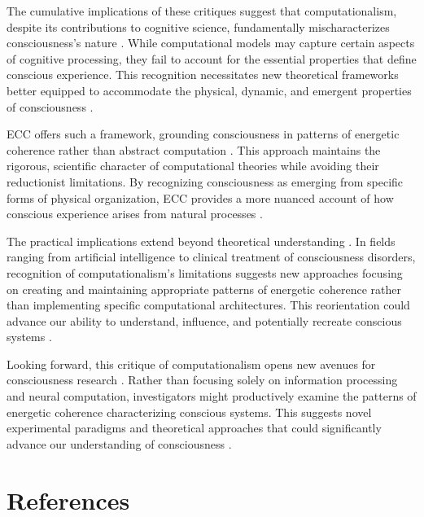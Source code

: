 \begin{refsection}
The cumulative implications of these critiques suggest that computationalism, despite its contributions to cognitive science, fundamentally mischaracterizes consciousness's nature \cite{dreyfus1972what}. While computational models may capture certain aspects of cognitive processing, they fail to account for the essential properties that define conscious experience. This recognition necessitates new theoretical frameworks better equipped to accommodate the physical, dynamic, and emergent properties of consciousness \cite{wheeler2005reconstructing}.

ECC offers such a framework, grounding consciousness in patterns of energetic coherence rather than abstract computation \cite{maturana1980autopoiesis}. This approach maintains the rigorous, scientific character of computational theories while avoiding their reductionist limitations. By recognizing consciousness as emerging from specific forms of physical organization, ECC provides a more nuanced account of how conscious experience arises from natural processes \cite{searle1980minds}.

The practical implications extend beyond theoretical understanding \cite{harnad1990symbol}. In fields ranging from artificial intelligence to clinical treatment of consciousness disorders, recognition of computationalism's limitations suggests new approaches focusing on creating and maintaining appropriate patterns of energetic coherence rather than implementing specific computational architectures. This reorientation could advance our ability to understand, influence, and potentially recreate conscious systems \cite{bickhard1995foundational}.

Looking forward, this critique of computationalism opens new avenues for consciousness research \cite{van1998dynamical}. Rather than focusing solely on information processing and neural computation, investigators might productively examine the patterns of energetic coherence characterizing conscious systems. This suggests novel experimental paradigms and theoretical approaches that could significantly advance our understanding of consciousness \cite{fodor2000mind}.

\newpage
\section{References}
\printbibliography[title={},heading=subbibliography]
\end{refsection}